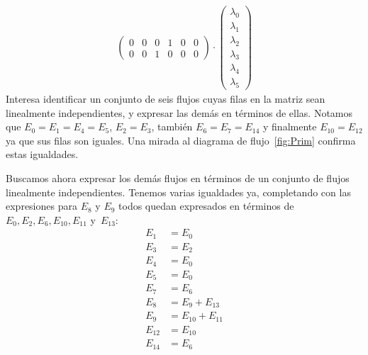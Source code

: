 \begin{align*}
\begin{pmatrix}
           0 & 0 & 0 & 1 & 0 & 0 \\
           0 & 0 & 1 & 0 & 0 & 0
         \end{pmatrix}
           \cdot \begin{pmatrix}
                   \lambda_0 \\
                   \lambda_1 \\
                   \lambda_2 \\
                   \lambda_3 \\
                   \lambda_4 \\
                   \lambda_5
                 \end{pmatrix}
  \end{align*}
  Interesa identificar un conjunto de seis flujos cuyas filas en la matriz
  sean linealmente independientes,
  y expresar las demás en términos de ellas.
  Notamos que \(E_0 = E_1 = E_4 = E_5\),
  \(E_2 = E_3\),
  también \(E_6 = E_7 = E_{14}\)
  y finalmente \(E_{10} = E_{12}\)
  ya que sus filas son iguales.
  Una mirada al diagrama de flujo~\ref{fig:Prim}
  confirma estas igualdades.

  Buscamos ahora expresar los demás flujos
  en términos de un conjunto de flujos linealmente independientes.
  Tenemos varias igualdades ya,
  completando con las expresiones para \(E_8\) y \(E_9\)
  todos quedan expresados en términos de
  \(E_0, E_2, E_6, E_{10}, E_{11}\) y~\(E_{13}\):
  \begin{align*}
    E_1
      &= E_0 \\
    E_3
      &= E_2 \\
    E_4
      &= E_0 \\
    E_5
      &= E_0 \\
    E_7
      &= E_6 \\
    E_8
      &= E_9 + E_{13} \\
    E_9
      &= E_{10} + E_{11} \\
    E_{12}
      &= E_{10} \\
    E_{14}
      &= E_6
  \end{align*}

